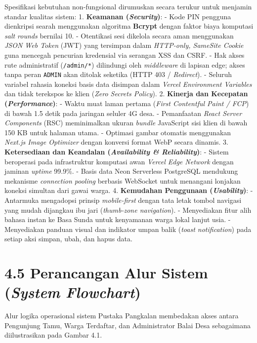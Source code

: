 \documentclass[
  indonesian,
  12pt,
]{report}
\begin{document}
Spesifikasi kebutuhan non-fungsional dirumuskan secara terukur untuk
menjamin standar kualitas sistem: 1. \textbf{Keamanan
(\emph{Security})}: - Kode PIN pengguna dienkripsi searah menggunakan
algoritma \textbf{Bcrypt} dengan faktor biaya komputasi \emph{salt
rounds} bernilai 10. - Otentikasi sesi dikelola secara aman menggunakan
\emph{JSON Web Token} (JWT) yang tersimpan dalam \emph{HTTP-only,
SameSite Cookie} guna mencegah pencurian kredensial via serangan XSS dan
CSRF. - Hak akses rute administratif (\texttt{/admin/*}) dilindungi oleh
\emph{middleware} di lapisan edge; akses tanpa peran \texttt{ADMIN} akan
ditolak seketika (HTTP 403 / \emph{Redirect}). - Seluruh variabel
rahasia koneksi basis data disimpan dalam \emph{Vercel Environment
Variables} dan tidak terekspos ke klien (\emph{Zero Secrets Policy}). 2.
\textbf{Kinerja dan Kecepatan (\emph{Performance})}: - Waktu muat laman
pertama (\emph{First Contentful Paint / FCP}) di bawah 1.5 detik pada
jaringan seluler 4G desa. - Pemanfaatan \emph{React Server Components}
(RSC) meminimalkan ukuran \emph{bundle} JavaScript sisi klien di bawah
150 KB untuk halaman utama. - Optimasi gambar otomatis menggunakan
\emph{Next.js Image Optimizer} dengan konversi format WebP secara
dinamis. 3. \textbf{Ketersediaan dan Keandalan (\emph{Availability \&
Reliability})}: - Sistem beroperasi pada infrastruktur komputasi awan
\emph{Vercel Edge Network} dengan jaminan \emph{uptime} 99.9\%. - Basis
data Neon Serverless PostgreSQL mendukung mekanisme \emph{connection
pooling} berbasis WebSocket untuk menangani lonjakan koneksi simultan
dari gawai warga. 4. \textbf{Kemudahan Penggunaan (\emph{Usability})}: -
Antarmuka mengadopsi prinsip \emph{mobile-first} dengan tata letak
tombol navigasi yang mudah dijangkau ibu jari (\emph{thumb-zone
navigation}). - Menyediakan fitur alih bahasa instan ke Basa Sunda untuk
kenyamanan warga lokal lanjut usia. - Menyediakan panduan visual dan
indikator umpan balik (\emph{toast notification}) pada setiap aksi
simpan, ubah, dan hapus data.

\section{\texorpdfstring{4.5 Perancangan Alur Sistem (\emph{System
Flowchart})}{4.5 Perancangan Alur Sistem (System Flowchart)}}\label{perancangan-alur-sistem-system-flowchart}

Alur logika operasional sistem Pustaka Pangkalan membedakan akses antara
Pengunjung Tamu, Warga Terdaftar, dan Administrator Balai Desa
sebagaimana diilustrasikan pada Gambar 4.1.
\end{document}
